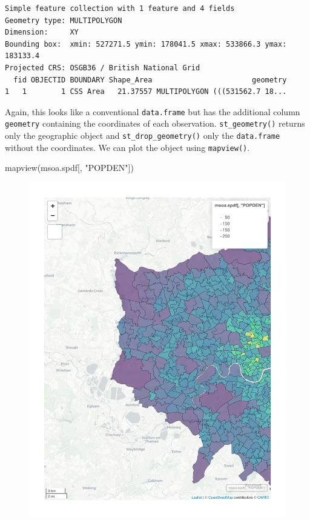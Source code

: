 \documentclass[
  letterpaper,
  DIV=11,
  numbers=noendperiod]{scrreprt}
\newenvironment{Shaded}{\begin{snugshade}}{\end{snugshade}}
\newcommand{\FunctionTok}[1]{\textcolor[rgb]{0.28,0.35,0.67}{#1}}
\newcommand{\NormalTok}[1]{\textcolor[rgb]{0.00,0.23,0.31}{#1}}
\newcommand{\StringTok}[1]{\textcolor[rgb]{0.13,0.47,0.30}{#1}}
\begin{document}
\begin{verbatim}
Simple feature collection with 1 feature and 4 fields
Geometry type: MULTIPOLYGON
Dimension:     XY
Bounding box:  xmin: 527271.5 ymin: 178041.5 xmax: 533866.3 ymax: 183133.4
Projected CRS: OSGB36 / British National Grid
  fid OBJECTID BOUNDARY Shape_Area                       geometry
1   1        1 CSS Area   21.37557 MULTIPOLYGON (((531562.7 18...
\end{verbatim}

Again, this looks like a conventional \texttt{data.frame} but has the
additional column \texttt{geometry} containing the coordinates of each
observation. \texttt{st\_geometry()} returns only the geographic object
and \texttt{st\_drop\_geometry()} only the \texttt{data.frame} without
the coordinates. We can plot the object using \texttt{mapview()}.

\begin{Shaded}
\begin{Highlighting}[]
\FunctionTok{mapview}\NormalTok{(msoa.spdf[, }\StringTok{"POPDEN"}\NormalTok{])}
\end{Highlighting}
\end{Shaded}

\begin{figure}[H]

{\centering \includegraphics{01_refresher_files/figure-pdf/unnamed-chunk-9-1.pdf}

}

\end{figure}
\end{document}
